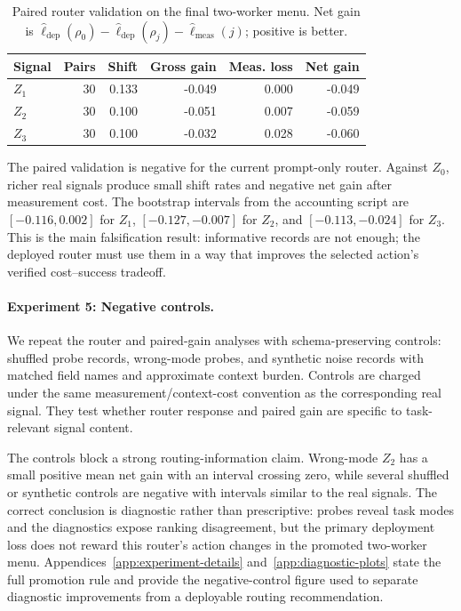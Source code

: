 \documentclass{article}
\begin{document}
\begin{table}[t]
\centering
\small
\caption{Paired router validation on the final two-worker menu.
Net gain is \(\widehat{\ell}_{\mathrm{dep}}(\rho_0)-\widehat{\ell}_{\mathrm{dep}}(\rho_j)-\widehat{\ell}_{\mathrm{meas}}(j)\); positive is better.}
\label{tab:twomodel-router-gain}
\begin{tabular}{@{}lrrrrr@{}}
\toprule
Signal & Pairs & Shift & Gross gain & Meas. loss & Net gain \\
\midrule
\(Z_1\) & 30 & 0.133 & -0.049 & 0.000 & -0.049 \\
\(Z_2\) & 30 & 0.100 & -0.051 & 0.007 & -0.059 \\
\(Z_3\) & 30 & 0.100 & -0.032 & 0.028 & -0.060 \\
\bottomrule
\end{tabular}
\end{table}

The paired validation is negative for the current prompt-only router.
Against \(Z_0\), richer real signals produce small shift rates and negative net gain after measurement cost.
The bootstrap intervals from the accounting script are \([-0.116,0.002]\) for \(Z_1\), \([-0.127,-0.007]\) for \(Z_2\), and \([-0.113,-0.024]\) for \(Z_3\).
This is the main falsification result: informative records are not enough; the deployed router must use them in a way that improves the selected action's verified cost--success tradeoff.

\paragraph{Experiment 5: Negative controls.}
We repeat the router and paired-gain analyses with schema-preserving controls: shuffled probe records, wrong-mode probes, and synthetic noise records with matched field names and approximate context burden.
Controls are charged under the same measurement/context-cost convention as the corresponding real signal.
They test whether router response and paired gain are specific to task-relevant signal content.

The controls block a strong routing-information claim.
Wrong-mode \(Z_2\) has a small positive mean net gain with an interval crossing zero, while several shuffled or synthetic controls are negative with intervals similar to the real signals.
The correct conclusion is diagnostic rather than prescriptive: probes reveal task modes and the diagnostics expose ranking disagreement, but the primary deployment loss does not reward this router's action changes in the promoted two-worker menu.
Appendices~\ref{app:experiment-details} and~\ref{app:diagnostic-plots} state the full promotion rule and provide the negative-control figure used to separate diagnostic improvements from a deployable routing recommendation.
\end{document}
